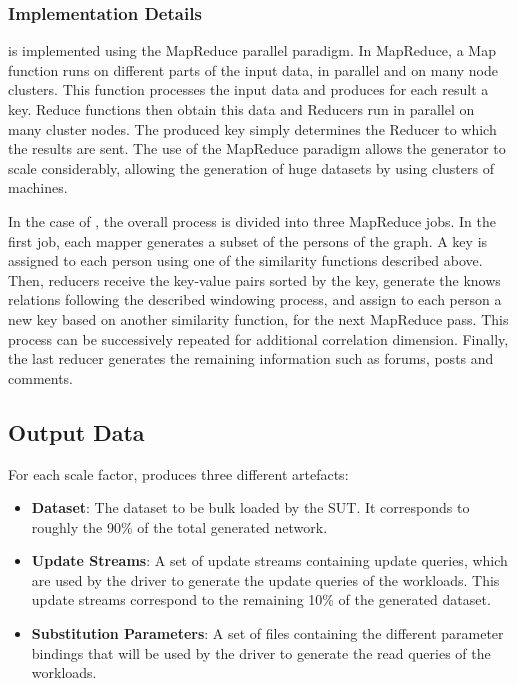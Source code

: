 \subsubsection{Implementation Details}

\datagen is implemented using the MapReduce parallel paradigm. In MapReduce, a
Map function runs on different parts of the input data, in parallel and on many
node clusters. This function processes the input data and produces for each
result a key. Reduce functions then obtain this data and Reducers run in
parallel on many cluster nodes. The produced key simply determines the Reducer
to which the results are sent. The use of the MapReduce paradigm allows the
generator to scale considerably, allowing the generation of huge datasets by
using clusters of machines.

In the case of \datagen, the overall process is divided into three MapReduce jobs.
In the first job, each mapper generates a subset of the persons of the graph. A
key is assigned to each person using one of the similarity functions described
above. Then, reducers receive the key-value pairs sorted by the key,
generate the knows relations following the described windowing process, and
assign to each person a new key based on another similarity function, for the
next MapReduce pass.  This process can be successively repeated for additional
correlation dimension.  Finally, the last reducer generates the remaining
information such as forums, posts and comments.

\subsection{Output Data}

For each scale factor, \datagen produces three different artefacts:
\begin{itemize}
  \item \textbf{Dataset}: The dataset to be bulk loaded by the SUT. It
    corresponds to roughly the 90\% of the total generated network.
  \item \textbf{Update Streams}: A set of update streams containing update
    queries, which are used by the driver to generate the update queries of the
    workloads. This update
    streams correspond to the remaining 10\% of the generated dataset.
  \item \textbf{Substitution Parameters}: A set of files containing the
    different parameter bindings that will be used by the driver to generate the
    read queries of the workloads.
\end{itemize}

